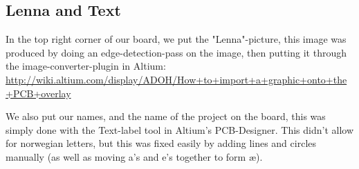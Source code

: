\subsection {Lenna and Text}
In the top right corner of our board, we put the "Lenna"-picture, this image
was produced by doing an edge-detection-pass on the image, then putting it through
the image-converter-plugin in Altium: \url{http://wiki.altium.com/display/ADOH/How+to+import+a+graphic+onto+the+PCB+overlay}

We also put our names, and the name of the project on the board, this was simply done
with the Text-label tool in Altium's PCB-Designer. This didn't allow for norwegian letters,
but this was fixed easily by adding lines and circles manually (as well as moving a's and e's together
to form æ).
